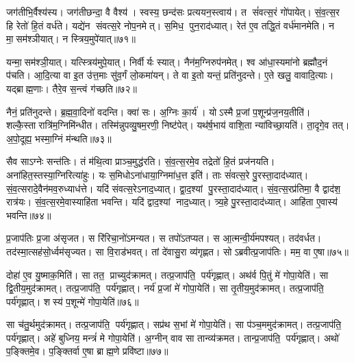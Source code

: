 जग॑तीभि॒र्वैश्य॑स्य। जग॑तीछन्दा॒ वै वैश्य॑। स्वस्य॒ छन्द॑सः प्रत्ययन॒स्त्वाय॑। त सं॑वत्स॒रं गो॑पायेत्। सं॒व॒त्स॒र हि रेतो॑ हि॒तं वर्ध॑ते। यद्ये॑न संवत्स॒रे नोप॒नमेत्। स॒मिध॒ पुन॒राद॑ध्यात्। रेत॑ ए॒व तद्धि॒तं वर्ध॑मानमेति। न मा॒सम॑श्ञीयात्। न स्त्रिय॒मुपे॑यात्॥७१॥

यन्मा॒सम॑श्ञी॒यात्। यत्स्त्रिय॑मुपे॒यात्। निर्वीर्यः स्यात्। नैन॑म॒ग्निरुप॑नमेत्। श्व आ॑धा॒स्यमा॑नो ब्रह्मौद॒नं प॑चति। आ॒दि॒त्या वा इ॒त उ॑त्त॒माः सु॑व॒र्गं लो॒कमा॑यन्। ते वा इ॒तो यन्तं॒ प्रति॑नुदन्ते। ए॒ते खलु॒ वावादि॒त्याः। यद्ब्राह्म॒णाः। तैरे॒व स॒न्त्वं ग॑च्छति॥७२॥

नैनं॒ प्रति॑नुदन्ते। ब्र॒ह्म॒वा॒दिनो॑ वदन्ति। क्वा॑ सः। अ॒ग्निः का॒र्य॑। योऽस्मै प्र॒जां प॒शून्प्र॑ज॒नय॒तीति॑। शल्कै॒स्तारात्रि॑म॒ग्निमि॑न्धीत। तस्मि॑न्नुपव्यु॒षम॒रणी॒ निष्ट॑पेत्। यथ॑र्\mbox{}ष॒भाय॑ वाशि॒ता न्या॑विच्छा॒यति॑। ता॒दृगे॒व तत्। अ॒पो॒दूह्य॒ भस्मा॒ग्निं म॑न्थति॥७३॥

सैव साऽग्नेः सन्त॑तिः। तं म॑थि॒त्वा प्राञ्च॒मुद्ध॑रति। सं॒व॒त्स॒रमे॒व तद्रेतो॑ हि॒तं प्रज॑नयति। अना॑हित॒स्तस्या॒ग्निरित्या॑हुः। यः स॒मिधोऽना॑धाया॒ग्निमा॑ध॒त्त इति॑। ताः सं॑वत्स॒रे पु॒रस्ता॒दाद॑ध्यात्। सं॒व॒त्सरादे॒वैन॑मव॒रुध्याध॑त्ते। यदि॑ संवत्स॒रेऽनाद॒ध्यात्। द्वा॒द॒श्यां पु॒रस्ता॒दाद॑ध्यात्। सं॒व॒त्स॒रप्र॑तिमा॒ वै द्वाद॑श॒ रात्र॑यः। सं॒व॒त्स॒रमे॒वास्याहि॑ता भवन्ति। यदि॑ द्वाद॒श्यां नाद॒ध्यात्। त्र्य॒हे पु॒रस्ता॒दाद॑ध्यात्। आहि॑ता ए॒वास्य॑ भवन्ति॥७४॥

प्र॒जाप॑तिः प्र॒जा अ॑सृजत। स रि॑रिचा॒नो॑ऽमन्यत। स तपो॑ऽतप्यत। स आ॒त्मन्वी॒र्य॑मपश्यत्। तद॑वर्धत। तद॑स्मा॒त्सह॑सो॒र्ध्वम॑सृज्यत। सा वि॒राड॑भवत्। तां दे॑वासु॒रा व्य॑गृह्णत। सोऽब्रवीत्प्र॒जाप॑तिः। मम॒ वा ए॒षा॥७५॥

दोहा॑ ए॒व यु॒ष्माक॒मिति॑। सा तत॒ प्राच्युद॑क्रामत्। तत्प्र॒जाप॑ति॒ पर्य॑गृह्णात्। अथ॑र्व पि॒तुं मे॑ गोपा॒येति॑। सा द्वि॒तीय॒मुद॑क्रामत्। तत्प्र॒जाप॑ति॒ पर्य॑गृह्णात्। नर्य॑ प्र॒जां मे॑ गोपा॒येति॑। सा तृ॒तीय॒मुद॑क्रामत्। तत्प्र॒जाप॑ति॒ पर्य॑गृह्णात्। शस्य॑ प॒शून्मे॑ गोपा॒येति॑॥७६॥

सा च॑तु॒र्थमुद॑क्रामत्। तत्प्र॒जाप॑ति॒ पर्य॑गृह्णात्। सप्र॑थ स॒भां मे॑ गोपा॒येति॑। सा प॑ञ्च॒ममुद॑क्रामत्। तत्प्र॒जाप॑ति॒ पर्य॑गृह्णात्। अहे॑ बुध्निय॒ मन्त्रं॑ मे गोपा॒येति॑। अ॒ग्नीन् वाव सा तान्व्य॑क्रमत। तान्प्र॒जाप॑ति॒ पर्य॑गृह्णात्। अथो॑ प॒ङ्क्तिमे॒व। प॒ङ्क्तिर्वा ए॒षा ब्राह्म॒णे प्रवि॑ष्टा॥७७॥

